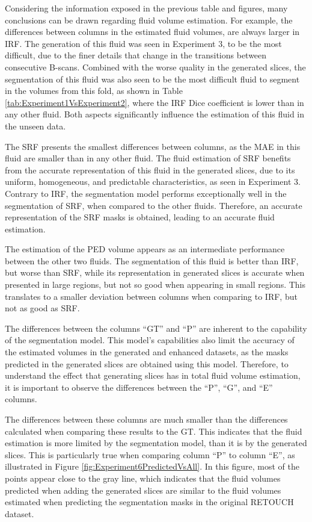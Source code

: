 Considering the information exposed in the previous table and figures, many conclusions can be drawn regarding fluid volume estimation. For example, the differences between columns in the estimated fluid volumes, are always larger in IRF. The generation of this fluid was seen in Experiment 3, to be the most difficult, due to the finer details that change in the transitions between consecutive B-scans. Combined with the worse quality in the generated slices, the segmentation of this fluid was also seen to be the most difficult fluid to segment in the volumes from this fold, as shown in Table \ref{tab:Experiment1VsExperiment2}, where the IRF Dice coefficient is lower than in any other fluid. Both aspects significantly influence the estimation of this fluid in the unseen data. 
\par
The SRF presents the smallest differences between columns, as the MAE in this fluid are smaller than in any other fluid. The fluid estimation of SRF benefits from the accurate representation of this fluid in the generated slices, due to its uniform, homogeneous, and predictable characteristics, as seen in Experiment 3. Contrary to IRF, the segmentation model performs exceptionally well in the segmentation of SRF, when compared to the other fluids. Therefore, an accurate representation of the SRF masks is obtained, leading to an accurate fluid estimation.
\par
The estimation of the PED volume appears as an intermediate performance between the other two fluids. The segmentation of this fluid is better than IRF, but worse than SRF, while its representation in generated slices is accurate when presented in large regions, but not so good when appearing in small regions. This translates to a smaller deviation between columns when comparing to IRF, but not as good as SRF.
\par
The differences between the columns ``GT'' and ``P'' are inherent to the capability of the segmentation model. This model's capabilities also limit the accuracy of the estimated volumes in the generated and enhanced datasets, as the masks predicted in the generated slices are obtained using this model. Therefore, to understand the effect that generating slices has in total fluid volume estimation, it is important to observe the differences between the ``P'', ``G'', and ``E'' columns. 
\par
The differences between these columns are much smaller than the differences calculated when comparing these results to the GT. This indicates that the fluid estimation is more limited by the segmentation model, than it is by the generated slices. This is particularly true when comparing column ``P'' to column ``E'', as illustrated in Figure \ref{fig:Experiment6PredictedVsAll}. In this figure, most of the points appear close to the gray line, which indicates that the fluid volumes predicted when adding the generated slices are similar to the fluid volumes estimated when predicting the segmentation masks in the original RETOUCH dataset.
